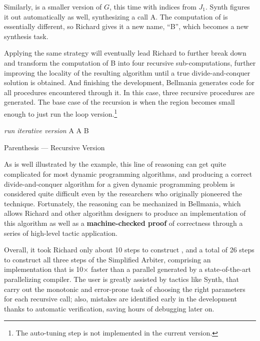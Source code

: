 Similarly, {\it {}} is a smaller version of $G$, this time with
indices from $J_1$. {\sf Synth} figures it out automatically as well,
synthesizing a call A. The computation of
 is essentially different, so Richard gives it a new name, ``B'',
which becomes a new synthesis task.

Applying the same strategy will eventually lead Richard to further
break down and transform the computation of B into four recursive
sub-computations, 
further improving the locality of the resulting algorithm until
a true divide-and-conquer solution is obtained.
And finishing the development, Bellmania generates code for
all procedures encountered through it. In this case, three recursive procedures
are generated. The base case of the recursion is when the region
becomes small enough to just run the loop version.\footnote{The auto-tuning step is not implemented in the current version.}


\begin{algorithm}
\renewcommand\arraystretch{1.3}
\begin{algorithmic}
\EndProcedure
   {\it run iterative version}
  \Else
  \State A 
  \State A 
  \State B 
  \EndIf
\end{algorithmic}
\caption{\label{overview:recursive-A}
   Parenthesis --- Recursive Version}
\end{algorithm}

As is well illustrated by the example, this line of reasoning can get quite complicated for most dynamic programming algorithms, 
and producing a correct divide-and-conquer algorithm for a given dynamic programming problem is considered quite difficult even by the researchers who originally pioneered the technique. 
Fortunately, the reasoning can be mechanized in Bellmania, which allows
Richard and other algorithm designers to produce an implementation of this algorithm
as well as a {\bf machine-checked proof} of correctness
through a series of high-level tactic application.

Overall, it took Richard only about 10 steps to construct ,
and a total of 26 steps to construct all three steps of the Simplified Arbiter,
comprising an implementation that is 10$\times$ faster than a parallel
 generated by a state-of-the-art parallelizing compiler.
The user is greatly assisted by tactics like {\sf Synth}, that carry out the monotonic
and error-prone task of choosing the right parameters for each recursive call; also,
mistakes are identified early in the development thanks to automatic verification,
saving hours of debugging later on.

